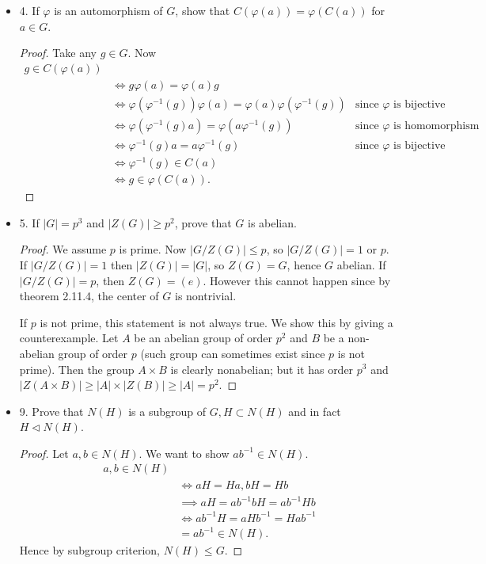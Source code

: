 \begin{itemize}[resume]
	\item 4. If $\varphi$ is an automorphism of $G$, show that $C(\varphi(a))=\varphi(C(a))$ for $a \in G$.
\begin{proof}
	Take any $g \in G$.  Now
	\begin{align*}
		g \in C(\varphi(a))\\
		&\iff g \varphi(a) = \varphi(a) g \\
		&\iff \varphi(\varphi^{-1} (g))\varphi(a) = \varphi(a) \varphi(\varphi^{-1} (g)) & \text{since $\varphi$ is bijective} \\
		&\iff \varphi(\varphi^{-1} (g) a) = \varphi(a \varphi^{-1} (g)) &\text{since $\varphi$ is homomorphism} \\
		&\iff \varphi^{-1} (g) a = a \varphi^{-1} (g) &\text{since $\varphi$ is bijective} \\
		&\iff \varphi^{-1} (g) \in C(a) \\
		&\iff g \in \varphi(C(a)) 
	.\end{align*}
\end{proof}

	\item 5. If $|G|=p^3$ and $|Z(G)| \geq p^2$, prove that $G$ is abelian.
\begin{proof}
	We assume $p$ is prime. Now $|G / Z(G)| \le p$, so $|G / Z(G)| = 1 $ or $p$. If  $|G / Z(G)| = 1$ then $|Z(G)| = |G|$, so $Z(G) = G$, hence $G $ abelian.
	If $|G / Z(G)| = p$, then  $Z(G) = \left( e \right) $. However this cannot happen since by theorem 2.11.4, the center of $G$ is nontrivial.

If $p$ is not prime, this statement is not always true. We show this by giving a counterexample. Let $A$ be an abelian group of order $p^2$ and $B$ be a non-abelian group of order $p$ (such group can sometimes exist since $p$ is not prime). Then the group $A \times B$ is clearly nonabelian; but it has order $p^3$ and $|Z(A \times B)| \ge  |A| \times |Z(B)| \ge  |A| = p^2$. 
\end{proof}

	\item 9. Prove that $N(H)$ is a subgroup of $G, H \subset N(H)$ and in fact $H \triangleleft N(H)$.
\begin{proof}
	Let $a, b \in N(H)$. We want to show $ab^{-1}  \in N(H)$.
	\begin{align*}
		a,b \in N(H)\\
		&\iff aH = Ha, bH = Hb \\
		&\implies a H = a b^{-1} b H = ab^{-1} H b \\
		&\iff ab^{-1} H = aH b^{-1}  = H ab^{-1}  \\
		&= ab^{-1}  \in N(H)
	.\end{align*}
	Hence by subgroup criterion, $N(H) \le  G$.


\end{proof}
\end{itemize}
